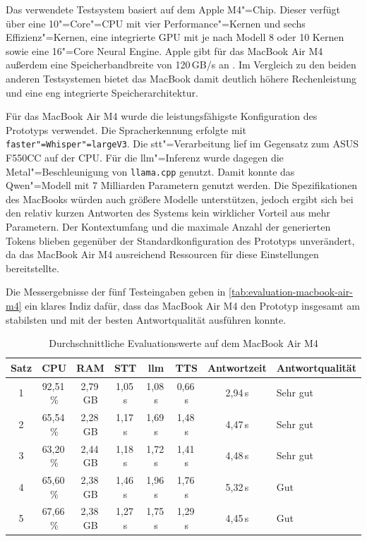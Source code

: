 Das verwendete Testsystem basiert auf dem Apple M4"=Chip. Dieser verfügt über eine 10"=Core"=CPU mit vier Performance"=Kernen und sechs Effizienz"=Kernen, eine integrierte GPU mit je nach Modell 8 oder 10 Kernen sowie eine 16"=Core Neural Engine. Apple gibt für das MacBook Air M4 außerdem eine Speicherbandbreite von 120\,GB/s an \autocite{MacBookAirM4-Documentation}. Im Vergleich zu den beiden anderen Testsystemen bietet das MacBook damit deutlich höhere Rechenleistung und eine eng integrierte Speicherarchitektur.

Für das MacBook Air M4 wurde die leistungsfähigste Konfiguration des Prototyps verwendet. Die Spracherkennung erfolgte mit \texttt{faster"=Whisper"=largeV3}. Die \gls{stt}"=Verarbeitung lief im Gegensatz zum ASUS F550CC auf der CPU. Für die \gls{llm}"=Inferenz wurde dagegen die Metal"=Beschleunigung von \texttt{llama.cpp} genutzt. Damit konnte das Qwen"=Modell mit 7 Milliarden Parametern genutzt werden. Die Spezifikationen des MacBooks würden auch größere Modelle unterstützen, jedoch ergibt sich bei den relativ kurzen Antworten des Systems kein wirklicher Vorteil aus mehr Parametern.  Der Kontextumfang und die maximale Anzahl der generierten Tokens blieben gegenüber der Standardkonfiguration des Prototyps unverändert, da das MacBook Air M4 ausreichend Ressourcen für diese Einstellungen bereitstellte.

Die Messergebnisse der fünf Testeingaben geben in \autoref{tab:evaluation-macbook-air-m4} ein klares Indiz dafür, dass das MacBook Air M4 den Prototyp insgesamt am stabilsten und mit der besten Antwortqualität ausführen konnte.

\begin{table}[H]
  \centering
  \caption{Durchschnittliche Evaluationswerte auf dem MacBook Air M4}
  \label{tab:evaluation-macbook-air-m4}
  \small
  \begin{tabular}{c c c c c c c l}
    \toprule
    \textbf{Satz}        &
    \textbf{CPU}         &
    \textbf{RAM}         &
    \textbf{STT}         &
    \textbf{\gls{llm}}   &
    \textbf{TTS}         &
    \textbf{Antwortzeit} &
    \textbf{Antwortqualität}                                                                       \\
    \midrule
    1                    & 92,51\,\% & 2,79\,GB & 1,05\,s & 1,08\,s & 0,66\,s & 2,94\,s & Sehr gut \\
    2                    & 65,54\,\% & 2,28\,GB & 1,17\,s & 1,69\,s & 1,48\,s & 4,47\,s & Sehr gut \\
    3                    & 63,20\,\% & 2,44\,GB & 1,18\,s & 1,72\,s & 1,41\,s & 4,48\,s & Sehr gut \\
    4                    & 65,60\,\% & 2,38\,GB & 1,46\,s & 1,96\,s & 1,76\,s & 5,32\,s & Gut      \\
    5                    & 67,66\,\% & 2,38\,GB & 1,27\,s & 1,75\,s & 1,29\,s & 4,45\,s & Gut      \\
    \bottomrule
  \end{tabular}
\end{table}

